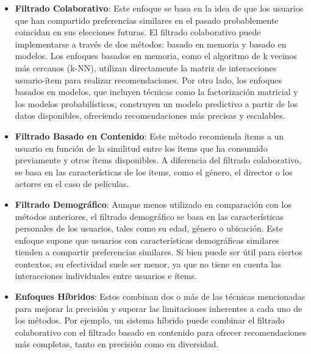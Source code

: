 \documentclass[runningheads,a4paper]{llncs}
\begin{document}
\begin{itemize}
    \item \textbf{Filtrado Colaborativo}: 
    Este enfoque se basa en la idea de que los 
    usuarios que han compartido preferencias similares 
    en el pasado probablemente coincidan en sus 
    elecciones futuras. El filtrado colaborativo puede 
    implementarse a través de dos métodos: 
    basado en memoria y basado en modelos. 
    Los enfoques basados en memoria, como el algoritmo 
    de k vecinos más cercanos (k-NN), utilizan 
    directamente la matriz de interacciones 
    usuario-ítem para realizar recomendaciones. 
    Por otro lado, los enfoques basados en modelos, 
    que incluyen técnicas como la factorización 
    matricial y los modelos probabilísticos, 
    construyen un modelo predictivo a partir de los 
    datos disponibles, ofreciendo recomendaciones más 
    precisas y escalables. \cite{estado_arte_sistemas_recomendacion}
    \item \textbf{Filtrado Basado en Contenido}: 
    Este método recomienda ítems a un usuario en 
    función de la similitud entre los ítems que ha 
    consumido previamente y otros ítems disponibles. 
    A diferencia del filtrado colaborativo, se basa en 
    las características de los ítems, como el género, 
    el director o los actores en el caso de películas. \cite{estado_arte_sistemas_recomendacion}
    \item \textbf{Filtrado Demográfico}: 
    Aunque menos utilizado en comparación con los 
    métodos anteriores, el filtrado demográfico se 
    basa en las características personales de los 
    usuarios, tales como su edad, género o ubicación. 
    Este enfoque supone que usuarios con 
    características demográficas similares tienden a 
    compartir preferencias similares. 
    Si bien puede ser útil para ciertos contextos, 
    su efectividad suele ser menor, ya que no tiene 
    en cuenta las interacciones individuales entre 
    usuarios e ítems. \cite{estado_arte_sistemas_recomendacion}
    \item \textbf{Enfoques Híbridos}:
    Estos combinan dos o más de las técnicas 
    mencionadas para mejorar la precisión y superar 
    las limitaciones inherentes a cada uno de los 
    métodos. Por ejemplo, un sistema híbrido puede 
    combinar el filtrado colaborativo con el filtrado 
    basado en contenido para ofrecer recomendaciones 
    más completas, tanto en precisión como en 
    diversidad. \cite{estado_arte_sistemas_recomendacion}
\end{itemize}
\end{document}
